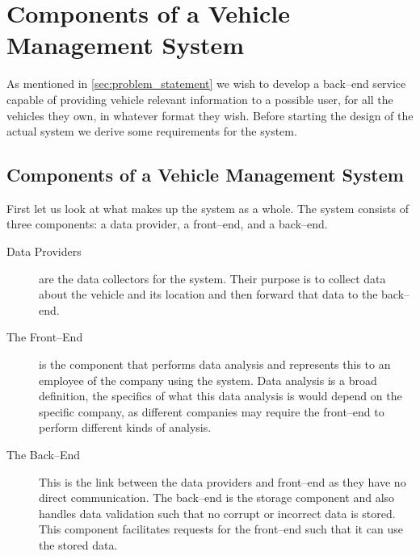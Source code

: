 \chapter{Components of a Vehicle Management System}\label{cha:requirements_elicitation}
As mentioned in \cref{sec:problem_statement} we wish to develop a back--end service capable of providing vehicle relevant information to a possible user, for all the vehicles they own, in whatever format they wish.
Before starting the design of the actual system we derive some requirements for the system.

\section{Components of a Vehicle Management System}\label{sec:constituents_of_the_system}
First let us look at what makes up the system as a whole.
The system consists of three components: a data provider, a front--end, and a back--end.
\begin{description}
    \item [Data Providers] are the data collectors for the system. Their purpose is to collect data about the vehicle and its location and then forward that data to the back--end.
    \item [The Front--End] is the component that performs data analysis and represents this to an employee of the company using the system.
    Data analysis is a broad definition, the specifics of what this data analysis is would depend on the specific company, as different companies may require the front--end to perform different kinds of analysis.
    \item [The Back--End] This is the link between the data providers and front--end as they have no direct communication.
    The back--end is the storage component and also handles data validation such that no corrupt or incorrect data is stored.
    This component facilitates requests for the front--end such that it can use the stored data.
\end{description}

